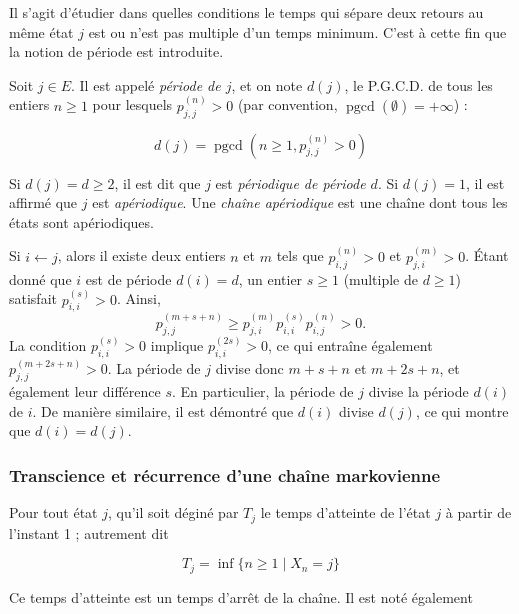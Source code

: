 \begin{sloppypar}
Il s’agit d’étudier dans quelles conditions le temps qui sépare deux retours au même état $j$ est ou n’est pas multiple d’un temps minimum. C'est à cette fin que la notion de période est introduite.

\begin{tcolorbox}[colback=blue!5!white,colframe=blue!75!black,title=Définition]
Soit $j \in E$. Il est appelé \emph{période de $j$}, et on note $d(j)$, le P.G.C.D. de tous les entiers $n \geq 1$ pour lesquels $p^{(n)}_{j,j} > 0$ (par convention, $\operatorname{pgcd}(\emptyset) = +\infty$) :

\begin{equation}
 d(j) = \operatorname{pgcd}(n \geq 1, p^{(n)}_{j,j} > 0)   
\end{equation}

Si $d(j) = d \geq 2$, il est dit que $j$ est \emph{périodique de période $d$}. Si $d(j) = 1$, il est affirmé que $j$ est \emph{apériodique}. Une \emph{chaîne apériodique} est une chaîne dont tous les états sont apériodiques.
\end{tcolorbox}

Si $i \gets j$, alors il existe deux entiers $n$ et $m$ tels que $p^{(n)}_{i,j} > 0$ et $p^{(m)}_{j,i} > 0$. 
Étant donné que $i$ est de période $d(i) = d$, un entier $s \geq 1$ (multiple de $d \geq 1$) satisfait $p^{(s)}_{i,i} > 0$. 
Ainsi, 
\[
p^{(m+s+n)}_{j,j} \geq p^{(m)}_{j,i} p^{(s)}_{i,i} p^{(n)}_{i,j} > 0.
\]
La condition $p^{(s)}_{i,i} > 0$ implique $p^{(2s)}_{i,i} > 0$, ce qui entraîne également $p^{(m+2s+n)}_{j,j} > 0$. La période de $j$ divise donc $m+s+n$ et $m+2s+n$, et également leur différence $s$. En particulier, la période de $j$ divise la période $d(i)$ de $i$. De manière similaire, il est démontré que $d(i)$ divise $d(j)$, ce qui montre que $d(i) = d(j)$.


\subsubsection{Transcience et récurrence d'une chaîne markovienne}

Pour tout état $j$, qu'il soit déginé par $T_j$ le temps d’atteinte de l’état $j$ à partir de l’instant 1 ; autrement dit

\begin{equation}
T_j = \inf \{ n \geq 1 \mid X_n = j \}  
\end{equation}

Ce temps d'atteinte est un temps d'arrêt de la chaîne. Il est noté également 


\end{sloppypar}
